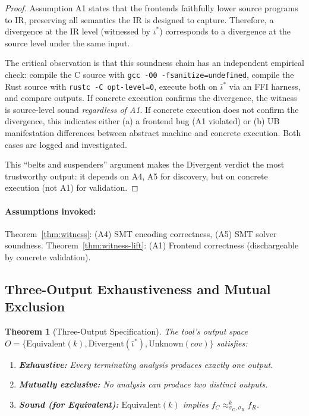 \documentclass[11pt]{article}
\newtheorem{theorem}{Theorem}[section]
\newcommand{\SemConfigC}{\sigma_{\mathrm{C}}}
\newcommand{\SemConfigR}{\sigma_{\mathrm{R}}}
\begin{document}
\begin{proof}
Assumption A1 states that the frontends faithfully lower source programs to IR, preserving all semantics the IR is designed to capture. Therefore, a divergence at the IR level (witnessed by $\bar{\iota}^*$) corresponds to a divergence at the source level under the same input.

The critical observation is that this soundness chain has an independent empirical check: compile the C source with \texttt{gcc -O0 -fsanitize=undefined}, compile the Rust source with \texttt{rustc -C opt-level=0}, execute both on $\bar{\iota}^*$ via an FFI harness, and compare outputs. If concrete execution confirms the divergence, the witness is source-level sound \emph{regardless of A1}. If concrete execution does not confirm the divergence, this indicates either (a) a frontend bug (A1 violated) or (b) UB manifestation differences between abstract machine and concrete execution. Both cases are logged and investigated.

This ``belts and suspenders'' argument makes the Divergent verdict the most trustworthy output: it depends on A4, A5 for discovery, but on concrete execution (not A1) for validation.
\end{proof}

\paragraph{Assumptions invoked:} Theorem~\ref{thm:witness}: (A4) SMT encoding correctness, (A5) SMT solver soundness. Theorem~\ref{thm:witness-lift}: (A1) Frontend correctness (dischargeable by concrete validation).


\subsection{Three-Output Exhaustiveness and Mutual Exclusion}

\begin{theorem}[Three-Output Specification]
\label{thm:three-output}
The tool's output space $O = \{\text{Equivalent}(k), \text{Divergent}(\bar{\iota}^*), \text{Unknown}(\mathit{cov})\}$ satisfies:
\begin{enumerate}
  \item \textbf{Exhaustive:} Every terminating analysis produces exactly one output.
  \item \textbf{Mutually exclusive:} No analysis can produce two distinct outputs.
  \item \textbf{Sound (for Equivalent):} $\text{Equivalent}(k)$ implies $f_C \approx^k_{\SemConfigC, \SemConfigR} f_R$.
\end{enumerate}
\end{theorem}
\end{document}
